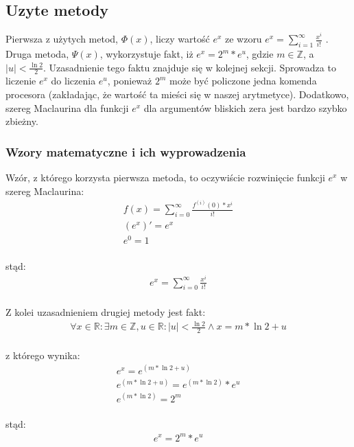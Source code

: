 \documentclass[11pt,wide]{mwart}
\begin{document}
\subsection{Uzyte metody}
Pierwsza z użytych metod, $\Phi(x)$, liczy wartość $e^x$ ze wzoru
\begin{math}
    e^x = \sum_{i=1}^{\infty}\frac{x^i}{i!}
\end{math}
. \\
\indent
Druga metoda, $\Psi(x)$, wykorzystuje fakt, iż $e^x = 2^m*e^u$, gdzie $m\in \mathbb{Z}$, a $|u| < \frac{\ln 2}{2}$. Uzasadnienie tego faktu znajduje się w kolejnej sekcji. Sprowadza to liczenie $e^x$ do liczenia $e^u$, ponieważ $2^m$ może być policzone jedna komenda procesora (zakładając, że wartość ta mieści się w naszej arytmetyce). Dodatkowo, szereg Maclaurina dla funkcji $e^x$ dla argumentów bliskich zera jest bardzo szybko zbieżny.
\subsubsection{Wzory matematyczne i ich wyprowadzenia}
Wzór, z którego korzysta pierwsza metoda, to oczywiście rozwinięcie funkcji $e^x$ w szereg Maclaurina:\\
\begin{gather}
        f(x) = \sum_{i=0}^{\infty}\frac{f^{(i)}(0)*x^i}{i!}\\
        (e^x)' = e^x\\
            e^0 = 1
\end{gather}
\\stąd: \\
\begin{gather}
        e^x = \sum_{i=0}^{\infty}\frac{x^i}{i!}
\end{gather}
\\
\indent Z kolei uzasadnieniem drugiej metody jest fakt:\\
\begin{gather}
    \forall x\in \mathbb{R} : \exists m\in \mathbb{Z}, u\in \mathbb{R} :
    |u| < \frac{\ln 2}{2} \wedge x = m*\ln 2 + u
\end{gather}
\\z którego wynika: \\
\begin{gather}
          e^x = e^{(m*\ln 2 + u)}\\
    e^{(m*\ln 2 + u)} = e^{(m*\ln 2)} * e^u\\
    e^{(m*\ln 2)} = 2^m
\end{gather}
\\ stąd: \\
\begin{gather}
        e^x = 2^m*e^u
\end{gather}
\end{document}
